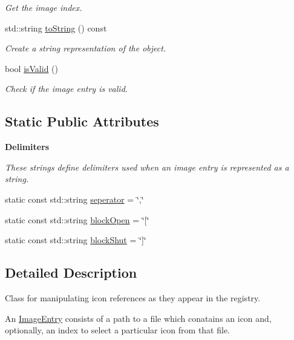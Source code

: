 \begin{DoxyCompactItemize}
\begin{DoxyCompactList}\small\item\em Get the image index. \end{DoxyCompactList}\item 
std\+::string \hyperlink{class_image_entry_a77085771fa6f74e9809ae852fd85c375}{to\+String} () const 
\begin{DoxyCompactList}\small\item\em Create a string representation of the object. \end{DoxyCompactList}\item 
bool \hyperlink{class_image_entry_acd053af5a4af1443443e3863f1df9b37}{is\+Valid} ()
\begin{DoxyCompactList}\small\item\em Check if the image entry is valid. \end{DoxyCompactList}\end{DoxyCompactItemize}
\subsection*{Static Public Attributes}
\begin{Indent}{\bf Delimiters}\par
{\em These strings define delimiters used when an image entry is represented as a string. }\begin{DoxyCompactItemize}
\item 
static const std\+::string \hyperlink{class_image_entry_ad4a7cf6088ced1381d05d3f1fcb7ba92}{seperator} = \char`\"{},\char`\"{}
\item 
static const std\+::string \hyperlink{class_image_entry_aad3911ab2c1a76a434c649344ed00394}{block\+Open} = \char`\"{}\mbox{[}\char`\"{}
\item 
static const std\+::string \hyperlink{class_image_entry_a3b9e7171180470a60857f679fe34dc58}{block\+Shut} = \char`\"{}\mbox{]}\char`\"{}
\end{DoxyCompactItemize}
\end{Indent}


\subsection{Detailed Description}
Class for manipulating icon references as they appear in the registry. 

An \hyperlink{class_image_entry}{Image\+Entry} consists of a path to a file which conatains an icon and, optionally, an index to select a particular icon from that file.

